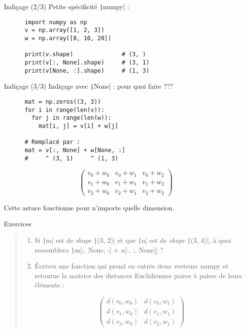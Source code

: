 \documentclass[10pt]{beamer}
\begin{document}
\begin{frame}[fragile]{Indiçage (2/3)}
  Petite spécificité \texttt|numpy| :

  \begin{beamercodeblock}
    \begin{verbatim}
      import numpy as np
      v = np.array([1, 2, 3])
      w = np.array([0, 10, 20])

      print(v.shape)              # (3, )
      print(v[:, None].shape)     # (3, 1)
      print(v[None, :].shape)     # (1, 3)
    \end{verbatim}
  \end{beamercodeblock}
\end{frame}

\begin{frame}[fragile]{Indiçage (3/3)}
  Indiçage avec \texttt|None| : pour quoi faire ???

  \begin{beamercodeblock}
    \begin{verbatim}
      mat = np.zeros((3, 3))
      for i in range(len(v)):
        for j in range(len(w)):
          mat[i, j] = v[i] + w[j]
      
      # Remplacé par :
      mat = v[:, None] + w[None, :]
      #     ^ (3, 1)     ^ (1, 3)
    \end{verbatim}
  \end{beamercodeblock}

  $$
    \left(
      \begin{matrix}
        v_0 + w_0 & v_0 + w_1 & v_0 + w_2 \\
        v_1 + w_0 & v_1 + w_1 & v_1 + w_2 \\
        v_2 + w_0 & v_2 + w_1 & v_2 + w_2
      \end{matrix}
    \right)
  $$

  Cette astuce fonctionne pour n'importe quelle dimension.
\end{frame}

\begin{frame}[fragile]{Exercices}
  \begin{quote}
    \begin{enumerate}
      \item Si \texttt|m| est de \emph{shape} \texttt|(3, 2)| et que \texttt|n| est de \emph{shape} \texttt|(3, 4)|, 
    à quoi ressemblera \texttt|m[:, None, :] + n[:, :, None]| ?
    
      \item Écrivez une fonction qui prend en entrée deux vecteurs numpy et retourne la matrice des distances Euclidiennes paires à paires de leurs éléments :
    
    $$
    \left(
      \begin{matrix}
        d(v_0, w_0) & d(v_0, w_1) \\
        d(v_1, w_0) & d(v_1, w_1) \\
        d(v_2, w_0) & d(v_2, w_1)
      \end{matrix}
    \right)
  $$
    \end{enumerate}
  \end{quote}
\end{frame}
\end{document}
